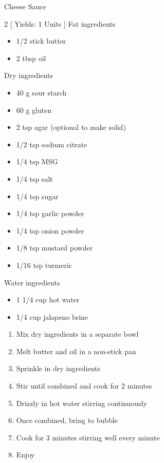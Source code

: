 \begin{Large}
    Cheese Sauce
\end{Large}

\begin{scriptsize}
\begin{multicols}{2}
[
\vspace{1em}
Yields: 1 Units
\vspace{-1.5em}
]
 Fat ingredients
\begin{itemize}
    \item 1/2 stick butter
    \item 2 tbsp oil
\end{itemize}

Dry ingredients
\begin{itemize}
    \item 40 g sour starch
    \item 60 g gluten
    \item 2 tsp agar (optional to make solid)
    \item 1/2 tsp sodium citrate
    \item 1/4 tsp MSG
    \item 1/4 tsp salt
    \item 1/4 tsp sugar
    \item 1/4 tsp garlic powder
    \item 1/4 tsp onion powder
    \item 1/8 tsp mustard powder
    \item 1/16 tsp turmeric
\end{itemize}

Water ingredients
\begin{itemize}
    \item 1 1/4 cup hot water
    \item 1/4 cup jalapeno brine
\end{itemize}
\end{multicols}
\end{scriptsize}

\begin{footnotesize}
\begin{enumerate}
    \item Mix dry ingredients in a separate bowl
    \item Melt butter and oil in a non-stick pan
    \item Sprinkle in dry ingredients
    \item Stir until combined and cook for 2 minutes
    \item Drizzly in hot water stirring continuously
    \item Once combined, bring to bubble
    \item Cook for 3 minutes stirring well every minute
    \item Enjoy

\end{enumerate}
\end{footnotesize}

\vspace{2em}
